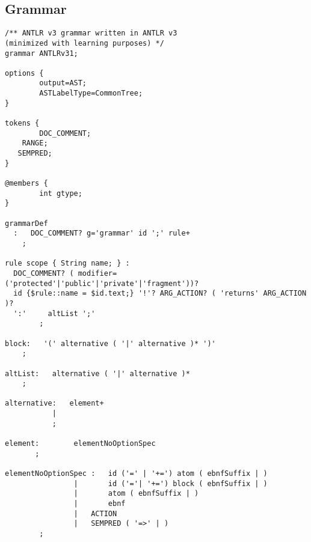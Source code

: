 \documentclass[a4paper,11pt]{article}
\begin{document}
\newpage
\begin{appendix}
\section{Grammar}
\begin{small}
\begin{lstlisting}
/** ANTLR v3 grammar written in ANTLR v3
(minimized with learning purposes) */
grammar ANTLRv31;

options {
        output=AST;
        ASTLabelType=CommonTree;
}

tokens {
        DOC_COMMENT;
    RANGE;
   SEMPRED;
}

@members {
        int gtype;
}

grammarDef
  :   DOC_COMMENT? g='grammar' id ';' rule+ 
    ;

rule scope { String name; } :
  DOC_COMMENT? ( modifier=('protected'|'public'|'private'|'fragment'))?
  id {$rule::name = $id.text;} '!'? ARG_ACTION? ( 'returns' ARG_ACTION )?
  ':'     altList ';'
        ;

block:   '(' alternative ( '|' alternative )* ')'
    ;

altList:   alternative ( '|' alternative )*
    ;

alternative:   element+ 
           |   
           ;

element:        elementNoOptionSpec
       ;

elementNoOptionSpec :   id ('=' | '+=') atom ( ebnfSuffix | )
                |       id ('='| '+=') block ( ebnfSuffix | )
                |       atom ( ebnfSuffix | )
                |       ebnf
                |   ACTION
                |   SEMPRED ( '=>' | )
        ;

\end{lstlisting}
\end{small}
\end{appendix}

\newpage
\end{document}

